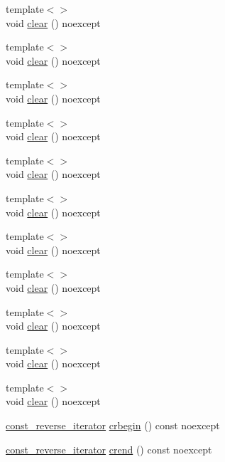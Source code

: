 \begin{DoxyCompactItemize}
\item 
{\footnotesize template$<$$>$ }\\void \mbox{\hyperlink{classvector_a04eec80d86ebc36032d43bd8dbe9942a}{clear}} () noexcept
\item 
{\footnotesize template$<$$>$ }\\void \mbox{\hyperlink{classvector_a04eec80d86ebc36032d43bd8dbe9942a}{clear}} () noexcept
\item 
{\footnotesize template$<$$>$ }\\void \mbox{\hyperlink{classvector_a04eec80d86ebc36032d43bd8dbe9942a}{clear}} () noexcept
\item 
{\footnotesize template$<$$>$ }\\void \mbox{\hyperlink{classvector_a04eec80d86ebc36032d43bd8dbe9942a}{clear}} () noexcept
\item 
{\footnotesize template$<$$>$ }\\void \mbox{\hyperlink{classvector_a04eec80d86ebc36032d43bd8dbe9942a}{clear}} () noexcept
\item 
{\footnotesize template$<$$>$ }\\void \mbox{\hyperlink{classvector_a04eec80d86ebc36032d43bd8dbe9942a}{clear}} () noexcept
\item 
{\footnotesize template$<$$>$ }\\void \mbox{\hyperlink{classvector_a04eec80d86ebc36032d43bd8dbe9942a}{clear}} () noexcept
\item 
{\footnotesize template$<$$>$ }\\void \mbox{\hyperlink{classvector_a04eec80d86ebc36032d43bd8dbe9942a}{clear}} () noexcept
\item 
{\footnotesize template$<$$>$ }\\void \mbox{\hyperlink{classvector_a04eec80d86ebc36032d43bd8dbe9942a}{clear}} () noexcept
\item 
{\footnotesize template$<$$>$ }\\void \mbox{\hyperlink{classvector_a04eec80d86ebc36032d43bd8dbe9942a}{clear}} () noexcept
\item 
{\footnotesize template$<$$>$ }\\void \mbox{\hyperlink{classvector_a04eec80d86ebc36032d43bd8dbe9942a}{clear}} () noexcept
\item 
\mbox{\hyperlink{classvector_a421ef78ccdc84f0f6b2b14e2732527ba}{const\+\_\+reverse\+\_\+iterator}} \mbox{\hyperlink{classvector_a88bc4e3e004d58bb0404fd051acf7476}{crbegin}} () const noexcept
\item 
\mbox{\hyperlink{classvector_a421ef78ccdc84f0f6b2b14e2732527ba}{const\+\_\+reverse\+\_\+iterator}} \mbox{\hyperlink{classvector_a461db7ad461ce36a720ec954b4d67951}{crend}} () const noexcept

\end{DoxyCompactItemize}
